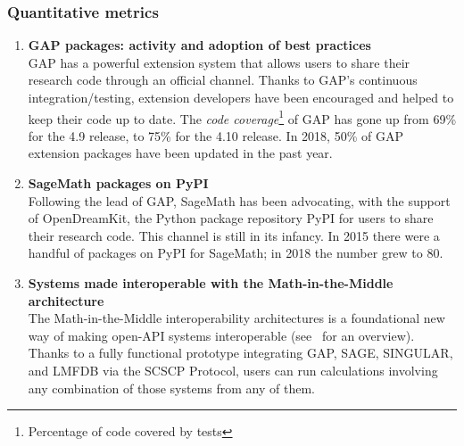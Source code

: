 \subsubsection{Quantitative metrics}

\begin{enumerate}
\item \textbf{GAP packages: activity and adoption of best practices}\\
  GAP has a powerful extension system that allows users to share their
  research code through an official channel. Thanks to GAP's
  continuous integration/testing, extension developers have been
  encouraged and helped to keep their code up to date. The \emph{code
    coverage}\footnote{Percentage of code covered by tests} of GAP has
  gone up from 69\% for the 4.9 release, to 75\% for the 4.10 release.
  In 2018, 50\% of GAP extension packages have been updated in the
  past year.
\item \textbf{SageMath packages on PyPI}\\
  Following the lead of GAP, SageMath has been advocating, with the
  support of OpenDreamKit, the Python package repository PyPI for
  users to share their research code. This channel is still in its
  infancy. In 2015 there were a handful of packages on PyPI for
  SageMath; in 2018 the number grew to 80.

\item \textbf{Systems made interoperable with the Math-in-the-Middle architecture}\\

  The Math-in-the-Middle interoperability architectures is a
  foundational new way of making open-API systems interoperable
  (see~\cite{ODK-D6.5} for an overview). Thanks to a fully functional
  prototype integrating GAP, SAGE, SINGULAR, and LMFDB via the SCSCP
  Protocol, users can run calculations involving any combination of
  those systems from any of them.


\end{enumerate}
